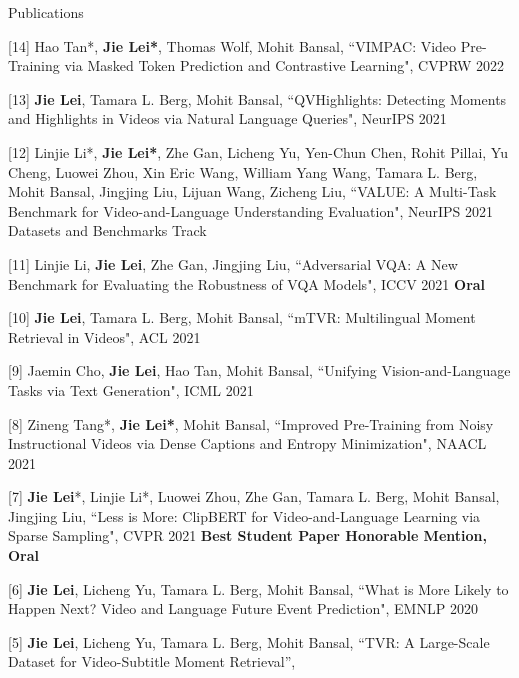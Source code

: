 \documentclass{resume} %
\begin{document}
\begin{rSection}{Publications}
    \item {[14] Hao Tan*, \textbf{Jie Lei*}, Thomas Wolf, Mohit Bansal,
            ``VIMPAC: Video Pre-Training via Masked Token Prediction and Contrastive Learning",
            CVPRW 2022
            }
    \item {[13] \textbf{Jie Lei}, Tamara L. Berg, Mohit Bansal,
            ``QVHighlights: Detecting Moments and Highlights in Videos via Natural Language Queries",
            NeurIPS 2021
            }
    \item {[12] Linjie Li*, \textbf{Jie Lei*}, Zhe Gan, Licheng Yu, Yen-Chun Chen, Rohit Pillai, Yu Cheng, Luowei Zhou, Xin Eric Wang, William Yang Wang, Tamara L. Berg, Mohit Bansal, Jingjing Liu, Lijuan Wang, Zicheng Liu,
            ``VALUE: A Multi-Task Benchmark for Video-and-Language Understanding Evaluation",
            NeurIPS 2021 Datasets and Benchmarks Track
            }
    \item {[11] Linjie Li, \textbf{Jie Lei}, Zhe Gan, Jingjing Liu,
            ``Adversarial VQA: A New Benchmark for Evaluating the Robustness of VQA Models",
            ICCV 2021 {\color{bittersweet}\textbf{Oral}}
            }
    \item {[10] \textbf{Jie Lei}, Tamara L. Berg, Mohit Bansal,
            ``mTVR: Multilingual Moment Retrieval in Videos",
            ACL 2021
            }
    \item {[9] Jaemin Cho, \textbf{Jie Lei}, Hao Tan, Mohit Bansal,
            ``Unifying Vision-and-Language Tasks via Text Generation",
            ICML 2021
            }
    \item {[8] Zineng Tang*, \textbf{Jie Lei*}, Mohit Bansal,
            ``Improved Pre-Training from Noisy Instructional Videos via Dense Captions and Entropy Minimization",
            NAACL 2021
            }
    \item {[7] \textbf{Jie Lei}*, Linjie Li*, Luowei Zhou, Zhe Gan, Tamara L. Berg, Mohit Bansal, Jingjing Liu,
            ``Less is More: ClipBERT for Video-and-Language Learning via Sparse Sampling",
            CVPR 2021 {\color{bittersweet}\textbf{Best Student Paper Honorable Mention, Oral}}
            }
    \item {[6] \textbf{Jie Lei}, Licheng Yu, Tamara L. Berg, Mohit Bansal,
            ``What is More Likely to Happen Next? Video and Language Future Event Prediction",
            EMNLP 2020
            }
   \item {[5] \textbf{Jie Lei}, Licheng Yu, Tamara L. Berg, Mohit Bansal,
        ``TVR: A Large-Scale Dataset for Video-Subtitle Moment Retrieval'',
}
\end{rSection}
\end{document}
